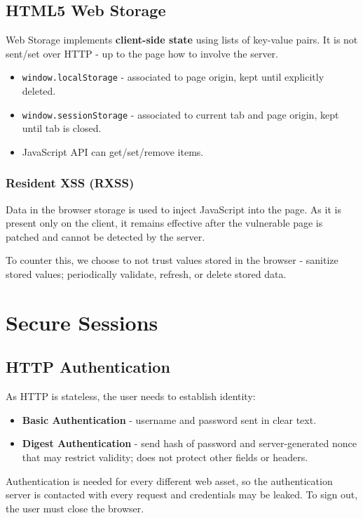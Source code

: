 \documentclass[11pt]{article}
\begin{document}
\subsection{HTML5 Web Storage}
Web Storage implements \textbf{client-side state} using lists of key-value pairs.
It is not sent/set over HTTP - up to the page how to involve the server.
\begin{itemize}
  \item \texttt{window.localStorage} - associated to page origin, kept until explicitly deleted.
  \item \texttt{window.sessionStorage} - associated to current tab and page origin, kept until tab is closed.
  \item JavaScript API can get/set/remove items.
\end{itemize}

\subsubsection{Resident XSS (RXSS)}
Data in the browser storage is used to inject JavaScript into the page.
As it is present only on the client, it remains effective after the vulnerable page is patched and cannot be detected by the server.

To counter this, we choose to not trust values stored in the browser - sanitize stored values; periodically validate, refresh, or delete stored data.

\section{Secure Sessions}
\subsection{HTTP Authentication} 
As HTTP is stateless, the user needs to establish identity:
\begin{itemize}
  \item \textbf{Basic Authentication} - username and password sent in clear text.
  \item \textbf{Digest Authentication} - send hash of password and server-generated nonce that may restrict validity; does not protect other fields or headers.
\end{itemize}

Authentication is needed for every different web asset, so the authentication server is contacted with every request and credentials may be leaked.
To sign out, the user must close the browser.
\end{document}
